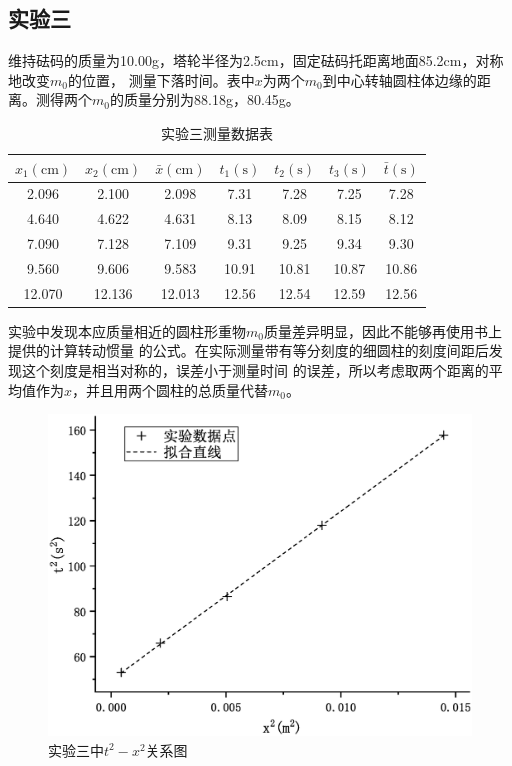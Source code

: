 \documentclass[a4paper]{ctexart}
\def\cm{\mathrm{cm}}
\def\s{\mathrm{s}}
\begin{document}
    \subsection{实验三}
    \par 
    维持砝码的质量为10.00g，塔轮半径为2.5cm，固定砝码托距离地面85.2cm，对称地改变$m_{0}$的位置，
    测量下落时间。表中$x$为两个$m_{0}$到中心转轴圆柱体边缘的距离。测得两个$m_{0}$的质量分别为88.18g，80.45g。
    \begin{table}[htbp]
        \centering
        \caption{实验三测量数据表}
        \begin{tabular}{ccccccc}
            \toprule[1.5pt]
            $x_{1}(\cm)$ & $x_{2}(\cm)$ & $\bar{x}(\cm)$ & $t_{1}(\s)$ & $t_{2}(\s)$ & $t_{3}(\s)$ & $\bar{t}(\s)$\\
            \midrule
            2.096 & 2.100 & 2.098 & 7.31 & 7.28 & 7.25 & 7.28\\
            4.640 & 4.622 & 4.631 & 8.13 & 8.09 & 8.15 & 8.12\\
            7.090 & 7.128 & 7.109 & 9.31 & 9.25 & 9.34 & 9.30\\
            9.560 & 9.606 & 9.583 & 10.91 & 10.81 & 10.87 & 10.86\\
            12.070 & 12.136 & 12.013 & 12.56 & 12.54 & 12.59 & 12.56\\
            \bottomrule[1.5pt]
        \end{tabular}
    \end{table}
    \par 
    实验中发现本应质量相近的圆柱形重物$m_{0}$质量差异明显，因此不能够再使用书上提供的计算转动惯量
    的公式。在实际测量带有等分刻度的细圆柱的刻度间距后发现这个刻度是相当对称的，误差小于测量时间
    的误差，所以考虑取两个距离的平均值作为$x$，并且用两个圆柱的总质量代替$m_{0}$。
    \begin{figure}[htbp]
        \centering
        \includegraphics[scale=0.48]{3_curve.eps}
        \caption{实验三中$t^{2}-x^{2}$关系图}
    \end{figure}
\end{document}

